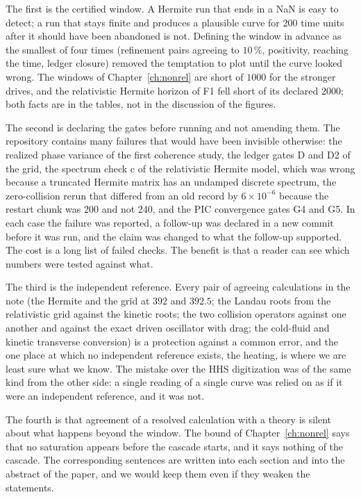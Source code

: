 The first is the certified window. A Hermite run that ends in a NaN is easy to detect; a run that stays finite and produces a plausible curve for 200 time units after it should have been abandoned is not. Defining the window in advance as the smallest of four times (refinement pairs agreeing to $10\,\%$, positivity, reaching the time, ledger closure) removed the temptation to plot until the curve looked wrong. The windows of Chapter~\ref{ch:nonrel} are short of $1000$ for the stronger drives, and the relativistic Hermite horizon of F1 fell short of its declared $2000$; both facts are in the tables, not in the discussion of the figures.

The second is declaring the gates before running and not amending them. The repository contains many failures that would have been invisible otherwise: the realized phase variance of the first coherence study, the ledger gates D and D2 of the grid, the spectrum check c of the relativistic Hermite model, which was wrong because a truncated Hermite matrix has an undamped discrete spectrum, the zero-collision rerun that differed from an old record by $6\times10^{-6}$ because the restart chunk was 200 and not 240, and the PIC convergence gates G4 and G5. In each case the failure was reported, a follow-up was declared in a new commit before it was run, and the claim was changed to what the follow-up supported. The cost is a long list of failed checks. The benefit is that a reader can see which numbers were tested against what.

The third is the independent reference. Every pair of agreeing calculations in the note (the Hermite and the grid at $392$ and $392.5$; the Landau roots from the relativistic grid against the kinetic roots; the two collision operators against one another and against the exact driven oscillator with drag; the cold-fluid and kinetic transverse conversion) is a protection against a common error, and the one place at which no independent reference exists, the heating, is where we are least sure what we know. The mistake over the HHS digitization was of the same kind from the other side: a single reading of a single curve was relied on as if it were an independent reference, and it was not.

The fourth is that agreement of a resolved calculation with a theory is silent about what happens beyond the window. The bound of Chapter~\ref{ch:nonrel} says that no saturation appears before the cascade starts, and it says nothing of the cascade. The corresponding sentences are written into each section and into the abstract of the paper, and we would keep them even if they weaken the statements.

